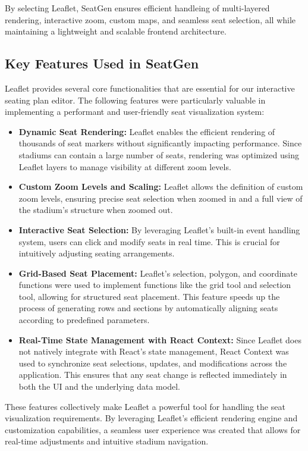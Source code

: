 By selecting Leaflet, SeatGen ensures efficient handleing of multi-layered rendering, interactive zoom, custom maps, and seamless seat selection, all while maintaining a lightweight and scalable frontend architecture.

\subsection{Key Features Used in SeatGen}

Leaflet provides several core functionalities that are essential for our interactive seating plan editor. The following features were particularly valuable in implementing a performant and user-friendly seat visualization system:

\begin{itemize}
    \item \textbf{Dynamic Seat Rendering:} Leaflet enables the efficient rendering of thousands of seat markers without significantly impacting performance. Since stadiums can contain a large number of seats, rendering was optimized using Leaflet layers to manage visibility at different zoom levels.
    \item \textbf{Custom Zoom Levels and Scaling:} Leaflet allows the definition of custom zoom levels, ensuring precise seat selection when zoomed in and a full view of the stadium’s structure when zoomed out.
    \item \textbf{Interactive Seat Selection:} By leveraging Leaflet’s built-in event handling system, users can click and modify seats in real time. This is crucial for intuitively adjusting seating arrangements.
    \item \textbf{Grid-Based Seat Placement:} Leaflet’s selection, polygon, and coordinate functions were used to implement functions like the grid tool and selection tool, allowing for structured seat placement. This feature speeds up the process of generating rows and sections by automatically aligning seats according to predefined parameters.
    \item \textbf{Real-Time State Management with React Context:} Since Leaflet does not natively integrate with React’s state management, React Context was used to synchronize seat selections, updates, and modifications across the application. This ensures that any seat change is reflected immediately in both the UI and the underlying data model.
\end{itemize}

These features collectively make Leaflet a powerful tool for handling the seat visualization requirements. By leveraging Leaflet’s efficient rendering engine and customization capabilities, a seamless user experience was created that allows for real-time adjustments and intuitive stadium navigation.

